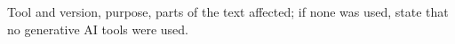 Tool and version, purpose, parts of the text affected; if none was used, state that no generative AI tools were used.
